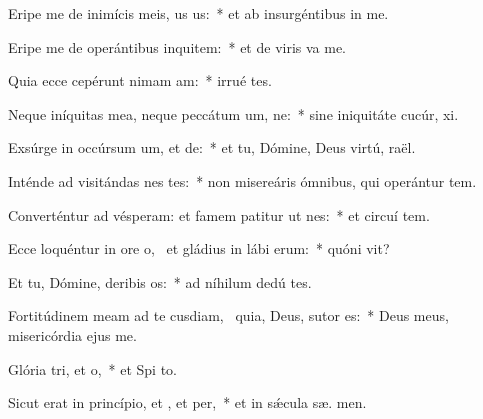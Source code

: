 \item Eripe me de inimícis meis, us us:~* et ab insurgéntibus in   me.
\item Eripe me de operántibus inquitem:~* et de viris  va me.
\item Quia ecce cepérunt nimam am:~* irrué   tes.
\item Neque iníquitas mea, neque peccátum um, ne:~* sine iniquitáte cucúr,  xi.
\item Exsúrge in occúrsum um, et de:~* et tu, Dómine, Deus virtú,  raël.
\item Inténde ad visitándas nes tes:~* non misereáris ómnibus, qui operántur tem.
\item Converténtur ad vésperam: et famem patitur ut nes:~* et circuí tem.
\item Ecce loquéntur in ore o,~\pscross{} et gládius in lábi erum:~* quóni  vit?
\item Et tu, Dómine, deribis os:~* ad níhilum dedú  tes.
\item Fortitúdinem meam ad te cusdiam,~\pscross{} quia, Deus, sutor  es:~* Deus meus, misericórdia ejus  me.
\item Glória tri, et o,~* et Spi to.
\item Sicut erat in princípio, et , et per,~* et in sǽcula sæ. men.
